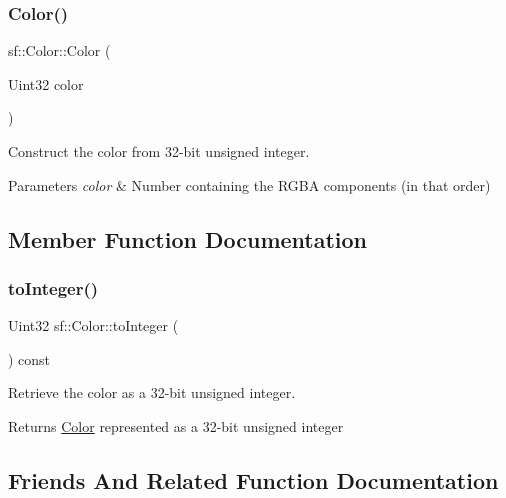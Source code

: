 \subsubsection{\texorpdfstring{Color()}{Color()}\hspace{0.1cm}{\footnotesize\ttfamily [3/3]}}
{\footnotesize\ttfamily sf\+::\+Color\+::\+Color (\begin{DoxyParamCaption}\item[{Uint32}]{color }\end{DoxyParamCaption})\hspace{0.3cm}{\ttfamily [explicit]}}



Construct the color from 32-\/bit unsigned integer. 


\begin{DoxyParams}{Parameters}
{\em color} & Number containing the R\+G\+BA components (in that order) \\
\hline
\end{DoxyParams}


\subsection{Member Function Documentation}
\mbox{\label{classsf_1_1_color_abb46e6942c4fe0d221574a46e642caa9}} 
\subsubsection{\texorpdfstring{to\+Integer()}{toInteger()}}
{\footnotesize\ttfamily Uint32 sf\+::\+Color\+::to\+Integer (\begin{DoxyParamCaption}{ }\end{DoxyParamCaption}) const}



Retrieve the color as a 32-\/bit unsigned integer. 

\begin{DoxyReturn}{Returns}
\hyperlink{classsf_1_1_color}{Color} represented as a 32-\/bit unsigned integer 
\end{DoxyReturn}


\subsection{Friends And Related Function Documentation}
\mbox{\label{classsf_1_1_color_a5d6501b7dd05f481b79f7163899f1d92}} 
